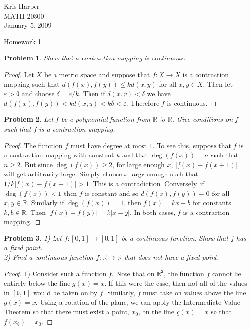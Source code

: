 \documentclass{article}
\newtheorem{problem}{Problem}
\begin{document}
\begin{flushright}
Kris Harper\\

MATH 20800\\

January 5, 2009
\end{flushright}

\begin{center}
Homework 1
\end{center}

\begin{flushleft}

\begin{problem}
Show that a contraction mapping is continuous.
\end{problem}
\begin{proof}
Let $X$ be a metric space and suppose that $f : X \rightarrow X$ is a contraction mapping such that $d(f(x), f(y)) \leq k d(x, y)$ for all $x,y \in X$. Then let $\varepsilon > 0$ and choose $\delta = \varepsilon / k$. Then if $d(x, y) < \delta$ we have $d(f(x), f(y)) < k d(x, y) < k \delta < \varepsilon$. Therefore $f$ is continuous.
\end{proof}

\begin{problem}
Let $f$ be a polynomial function from $\mathbb{R}$ to $\mathbb{R}$. Give conditions on $f$ such that $f$ is a contraction mapping.
\end{problem}
\begin{proof}
The function $f$ must have degree at most $1$. To see this, suppose that $f$ is a contraction mapping with constant $k$ and that $\deg(f(x)) = n$ such that $n \geq 2$. But since $\deg(f(x)) \geq 2$, for large enough $x$, $|f(x) - f(x+1)|$ will get arbitrarily large. Simply choose $x$ large enough such that $1/k |f(x) - f(x+1)| > 1$. This is a contradiction. Conversely, if $\deg (f(x)) < 1$ then $f$ is constant and so $d(f(x), f(y)) = 0$ for all $x,y \in \mathbb{R}$. Similarly if $\deg (f(x)) = 1$, then $f(x) = kx + b$ for constants $k, b \in \mathbb{R}$. Then $|f(x) - f(y)| = k |x - y|$. In both cases, $f$ is a contraction mapping.
\end{proof}

\begin{problem}
1) Let $f : [0,1] \rightarrow [0,1]$ be a continuous function. Show that $f$ has a fixed point.\\
2) Find a continuous function $f : \mathbb{R} \rightarrow \mathbb{R}$ that does not have a fixed point.
\end{problem}
\begin{proof}
1) Consider such a function $f$. Note that on $\mathbb{R}^2$, the function $f$ cannot lie entirely below the line $g(x) = x$. If this were the case, then not all of the values in $[0,1]$ would be taken on by $f$. Similarly, $f$ must take on values above the line $g(x) = x$. Using a rotation of the plane, we can apply the Intermediate Value Theorem so that there must exist a point, $x_0$, on the line $g(x) = x$ so that $f(x_0) = x_0$.\newline


\end{proof}
\end{flushleft}
\end{document}
